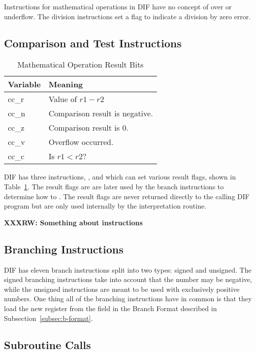 Instructions for mathematical operations in DIF have no concept of
over or underflow.  The division instructions set a flag to indicate a
division by zero error.

\subsection{Comparison and Test Instructions}
\label{sec:dif-cmp-tst}

\begin{table}
  \centering
    \begin{tabular}{|l|l|}
      \hline
      Variable & Meaning\\
      \hline
      cc\_r & Value of $r1 - r2$\\
      cc\_n & Comparison result is negative. \\
      cc\_z & Comparison result is 0.\\
      cc\_v & Overflow occurred.\\
      cc\_c & Is $r1 < r2$?\\
      \hline
  \end{tabular}
\label{tbl:cmp-vars}
\caption{Mathematical Operation Result Bits}
\end{table}

DIF has three instructions, ,  and
 which can set various result flags, shown in
Table~\ref{tbl:cmp-vars}.  The result flags are are later used by the
branch instructions to determine how to .  The result flags are never
returned directly to the calling DIF program but are only used
internally by the interpretation routine.

\textbf{XXXRW: Something about instructions}

\subsection{Branching Instructions}

DIF has eleven branch instructions split into two types: signed and
unsigned.  The signed branching instructions take into account that
the number may be negative, while the unsigned instructions are meant
to be used with exclusively positive numbers. One thing all of the
branching instructions have in common is that they load the new
 register from the  field in the Branch
Format described in Subsection~\ref{subsec:b-format}.

\subsection{Subroutine Calls}
\label{sec:subroutines}

